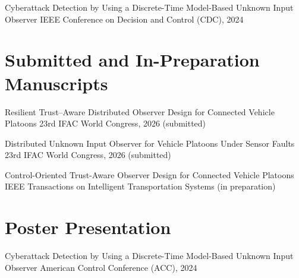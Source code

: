 {Cyberattack Detection by Using a Discrete-Time Model-Based Unknown Input Observer}
{IEEE Conference on Decision and Control (CDC), 2024}


\section*{Submitted and In-Preparation Manuscripts}


{Resilient Trust--Aware Distributed Observer Design for Connected Vehicle Platoons}
{23rd IFAC World Congress, 2026 (submitted)}

{Distributed Unknown Input Observer for Vehicle Platoons Under Sensor Faults}
{23rd IFAC World Congress, 2026 (submitted)}

{Control-Oriented Trust-Aware Observer Design for Connected Vehicle Platoons}
{IEEE Transactions on Intelligent Transportation Systems (in preparation)}
\section*{Poster Presentation}

{Cyberattack Detection by Using a Discrete-Time Model-Based Unknown Input Observer}
{American Control Conference (ACC), 2024}
